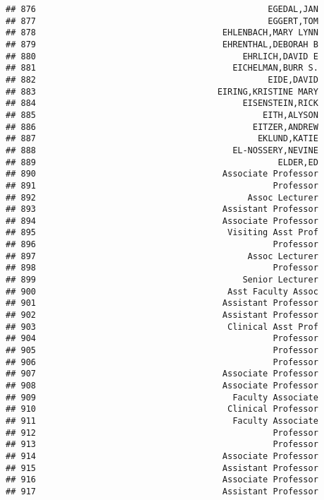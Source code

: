 \documentclass[
]{article}
\begin{document}
\begin{verbatim}
## 876                                              EGEDAL,JAN
## 877                                              EGGERT,TOM
## 878                                     EHLENBACH,MARY LYNN
## 879                                     EHRENTHAL,DEBORAH B
## 880                                         EHRLICH,DAVID E
## 881                                       EICHELMAN,BURR S.
## 882                                              EIDE,DAVID
## 883                                    EIRING,KRISTINE MARY
## 884                                         EISENSTEIN,RICK
## 885                                             EITH,ALYSON
## 886                                           EITZER,ANDREW
## 887                                            EKLUND,KATIE
## 888                                       EL-NOSSERY,NEVINE
## 889                                                ELDER,ED
## 890                                     Associate Professor
## 891                                               Professor
## 892                                          Assoc Lecturer
## 893                                     Assistant Professor
## 894                                     Associate Professor
## 895                                      Visiting Asst Prof
## 896                                               Professor
## 897                                          Assoc Lecturer
## 898                                               Professor
## 899                                         Senior Lecturer
## 900                                      Asst Faculty Assoc
## 901                                     Assistant Professor
## 902                                     Assistant Professor
## 903                                      Clinical Asst Prof
## 904                                               Professor
## 905                                               Professor
## 906                                               Professor
## 907                                     Associate Professor
## 908                                     Associate Professor
## 909                                       Faculty Associate
## 910                                      Clinical Professor
## 911                                       Faculty Associate
## 912                                               Professor
## 913                                               Professor
## 914                                     Associate Professor
## 915                                     Assistant Professor
## 916                                     Associate Professor
## 917                                     Assistant Professor

\end{verbatim}
\end{document}
